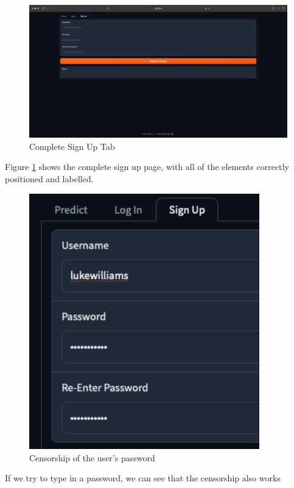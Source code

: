 \documentclass[12pt]{report}
\begin{document}
\begin{figure}[H]
\centering
\includegraphics[width=14cm]{ss14.4.png}
\caption{Complete Sign Up Tab}\label{fig:ss14.4}
\end{figure}

Figure \ref{fig:ss14.4} shows the complete sign up page, with all of the elements correctly positioned and labelled.

\begin{figure}[H]
\centering
\includegraphics[width=10cm]{ss14.5.png}
\caption{Censorship of the user's password}\label{fig:ss14.5}
\end{figure}

If we try to type in a password, we can see that the censorship also works

\begin{center}
\end{center}
\end{document}
